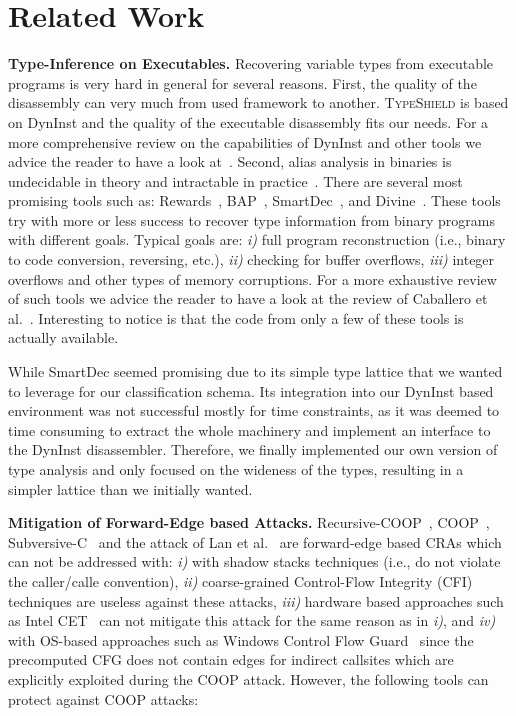 \section{Related Work}
\label{chapter:Related_Work}

\textbf{Type-Inference on Executables.}
\label{Type-Inference on Executables}
Recovering variable types from executable programs
is very hard in general for several reasons. 
First, the quality of the disassembly can very much from used
framework to another. \textsc{TypeShield} is based on DynInst 
and the quality of the executable disassembly fits our needs. 
For a more comprehensive review on the capabilities of DynInst and other tools we
advice the reader to have a look at~\cite{andriesse:indepth}.
Second, alias analysis in binaries is undecidable in theory and intractable in practice~\cite{alan:mycroft}.
There are several most promising tools such as: Rewards~\cite{lin:rewards}, BAP~\cite{bap:brumley}, 
SmartDec~\cite{fokin:smartdec}, and Divine~\cite{divine:balakrishnan}.
These tools try with more or less success to recover 
type information from binary programs with different goals.
Typical goals are: 
\textit{i)} full program reconstruction (i.e., binary to code conversion, reversing, etc.), 
\textit{ii)} checking for buffer overflows, 
\textit{iii)} integer overflows and other types of memory corruptions.
For a more exhaustive review of such tools we advice the reader to
have a look at the review of Caballero et al.~\cite{caballero:inference}.
Interesting to notice is that the code from only a few of these tools is actually available.

While SmartDec seemed promising due to its simple type lattice that we wanted to leverage for our classification schema. 
Its integration into our DynInst based environment was not successful mostly for time constraints, as it was deemed to 
time consuming to extract the whole machinery and implement an interface to the DynInst disassembler.
Therefore, we finally implemented our own version of type analysis and only focused on the wideness of the types, 
resulting in a simpler lattice than we initially wanted.

\textbf{Mitigation of Forward-Edge based Attacks.}
\label{Mitigation of Advanced Code-Reuse Attacks}
Recursive-COOP~\cite{crane:readactor++}, COOP~\cite{schuster:coop}, Subversive-C~\cite{subversive-c:lettner} and the attack of Lan et al.~\cite{loop:oriented}
are forward-edge based CRAs which can not be addressed with:
\textit{i)}  with shadow stacks techniques (i.e., do not violate the caller/calle convention), 
\textit{ii)} coarse-grained Control-Flow Integrity (CFI)~\cite{abadi:cfi2, abadi:cfi} techniques are useless against these attacks, 
\textit{iii)} hardware based approaches such as Intel CET~\cite{intel:cet} can not mitigate this attack for the same reason as in \textit{i)}, and 
\textit{iv)} with OS-based approaches such as Windows Control Flow Guard~\cite{windows:cfguard} 
since the precomputed CFG does not contain edges for indirect callsites which are explicitly exploited during the COOP attack.
However, the following tools can protect against COOP attacks:

